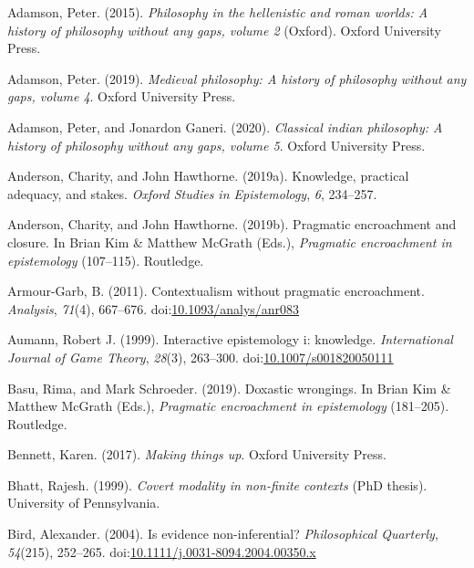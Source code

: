 \documentclass[
  10pt,
  letterpaper,
  twoside]{scrbook}
\newlength{\cslhangindent}
\newenvironment{CSLReferences}[2] %
 {\begin{list}{}{%
  \setlength{\itemindent}{0pt}
  \setlength{\leftmargin}{0pt}
  \setlength{\parsep}{0pt}
  \ifodd #1
   \setlength{\leftmargin}{\cslhangindent}
   \setlength{\itemindent}{-1\cslhangindent}
  \fi
  \setlength{\itemsep}{#2\baselineskip}}}
 {\end{list}}
\begin{document}
\label{refs}
\begin{CSLReferences}{1}{0}
Adamson, Peter. (2015). \emph{Philosophy in the hellenistic and roman
worlds: A history of philosophy without any gaps, volume 2} (Oxford).
Oxford University Press.

Adamson, Peter. (2019). \emph{Medieval philosophy: A history of
philosophy without any gaps, volume 4}. {O}xford {U}niversity {P}ress.

Adamson, Peter, and Jonardon Ganeri. (2020). \emph{Classical indian
philosophy: A history of philosophy without any gaps, volume 5}. Oxford
University Press.

Anderson, Charity, and John Hawthorne. (2019a). Knowledge, practical
adequacy, and stakes. \emph{Oxford Studies in Epistemology}, \emph{6},
234--257.

Anderson, Charity, and John Hawthorne. (2019b). Pragmatic encroachment
and closure. In Brian Kim \& Matthew McGrath (Eds.), \emph{Pragmatic
encroachment in epistemology} (107--115). Routledge.

Armour-Garb, B. (2011). Contextualism without pragmatic encroachment.
\emph{Analysis}, \emph{71}(4), 667--676.
doi:\href{https://doi.org/10.1093/analys/anr083}{10.1093/analys/anr083}

Aumann, Robert J. (1999). Interactive epistemology i: knowledge.
\emph{International Journal of Game Theory}, \emph{28}(3), 263--300.
doi:\href{https://doi.org/10.1007/s001820050111}{10.1007/s001820050111}

Basu, Rima, and Mark Schroeder. (2019). Doxastic wrongings. In Brian Kim
\& Matthew McGrath (Eds.), \emph{Pragmatic encroachment in epistemology}
(181--205). Routledge.

Bennett, Karen. (2017). \emph{Making things up}. Oxford University
Press.

Bhatt, Rajesh. (1999). \emph{Covert modality in non-finite contexts}
(PhD thesis). University of Pennsylvania.

Bird, Alexander. (2004). Is evidence non-inferential?
\emph{Philosophical Quarterly}, \emph{54}(215), 252--265.
doi:\href{https://doi.org/10.1111/j.0031-8094.2004.00350.x}{10.1111/j.0031-8094.2004.00350.x}


\end{CSLReferences}
\end{document}
